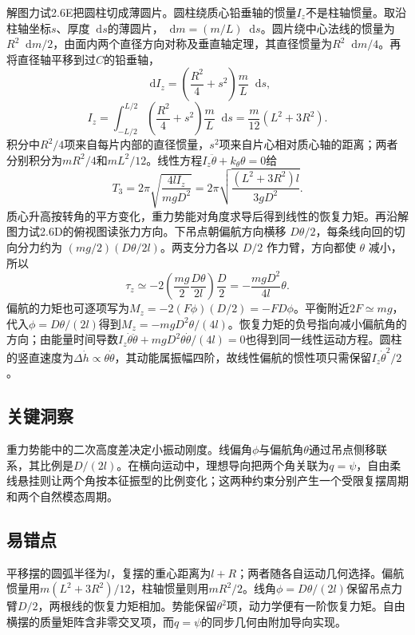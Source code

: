 \documentclass[UTF8,fontset=fandol,a4paper,11pt]{ctexart}
\newcommand{\dd}{\mathop{}\!\mathrm{d}}
\begin{document}
解图力试2.6E把圆柱切成薄圆片。圆柱绕质心铅垂轴的惯量$I_z$不是柱轴惯量。取沿柱轴坐标$s$、厚度$\dd s$的薄圆片，$\dd m=(m/L)\dd s$。圆片绕中心法线的惯量为$R^2\dd m/2$，由面内两个直径方向对称及垂直轴定理，其直径惯量为$R^2\dd m/4$。再将直径轴平移到过$C$的铅垂轴，
\[
\dd I_z=\left(\frac{R^2}{4}+s^2\right)\frac mL\dd s,
\]
\[
I_z=\int_{-L/2}^{L/2}
\left(\frac{R^2}{4}+s^2\right)\frac mL\dd s
=\frac m{12}(L^2+3R^2).
\]
积分中$R^2/4$项来自每片内部的直径惯量，$s^2$项来自片心相对质心轴的距离；两者分别积分为$mR^2/4$和$mL^2/12$。线性方程$I_z\ddot\theta+k_\theta\theta=0$给
\[
\boxed{T_3=2\pi\sqrt{\frac{4lI_z}{mgD^2}}
=2\pi\sqrt{\frac{(L^2+3R^2)l}{3gD^2}}}.
\]
质心升高按转角的平方变化，重力势能对角度求导后得到线性的恢复力矩。再沿解图力试2.6D的俯视图读张力方向。下吊点朝偏航方向横移 $D\theta/2$，每条线向回的切向分力约为 $(mg/2)(D\theta/2l)$。两支分力各以 $D/2$ 作力臂，方向都使 $\theta$ 减小，所以
\[
\tau_z \simeq -2\left(\frac{mg}{2}\frac{D\theta}{2l}\right)\frac D2
=-\frac{mgD^2}{4l}\theta.
\]
偏航的力矩也可逐项写为$M_z=-2(F\phi)(D/2)=-FD\phi$。平衡附近$2F\simeq mg$，代入$\phi=D\theta/(2l)$得到$M_z=-mgD^2\theta/(4l)$。恢复力矩的负号指向减小偏航角的方向；由能量时间导数$I_z\dot\theta\ddot\theta+mgD^2\theta\dot\theta/(4l)=0$也得到同一线性运动方程。圆柱的竖直速度为$\Delta\dot h\propto\theta\dot\theta$，其动能属振幅四阶，故线性偏航的惯性项只需保留$I_z\dot\theta^2/2$。





\subsection*{关键洞察}

重力势能中的二次高度差决定小振动刚度。线偏角$\phi$与偏航角$\theta$通过吊点侧移联系，其比例是$D/(2l)$。在横向运动中，理想导向把两个角关联为$q=\psi$，自由柔线悬挂则让两个角按本征振型的比例变化；这两种约束分别产生一个受限复摆周期和两个自然模态周期。



\subsection*{易错点}

平移摆的圆弧半径为$l$，复摆的重心距离为$l+R$；两者随各自运动几何选择。偏航惯量用$m(L^2+3R^2)/12$，柱轴惯量则用$mR^2/2$。线角$\phi=D\theta/(2l)$保留吊点力臂$D/2$，两根线的恢复力矩相加。势能保留$\theta^2$项，动力学便有一阶恢复力矩。自由横摆的质量矩阵含非零交叉项，而$q=\psi$的同步几何由附加导向实现。
\end{document}
